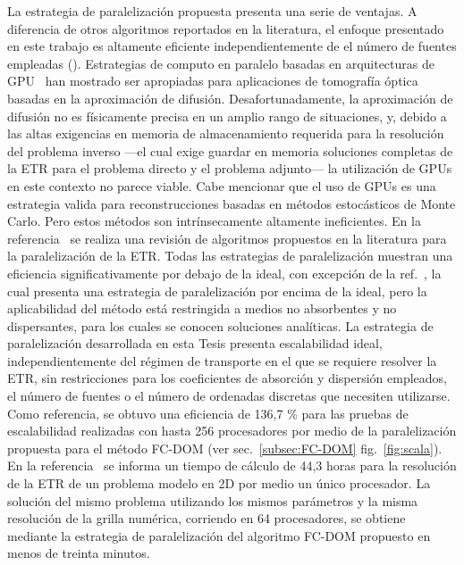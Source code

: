 La estrategia de paralelización propuesta presenta una serie de
ventajas. A diferencia de otros algoritmos reportados en la literatura, el enfoque
presentado en este trabajo es altamente eficiente independientemente de
el número de fuentes empleadas (\cf \cite{Hielscher2004}).
Estrategias de computo en paralelo basadas en arquitecturas de GPU~\cite {Doulgerakis2017} han mostrado ser apropiadas para aplicaciones de tomografía óptica basadas en la aproximación de difusión. Desafortunadamente, 
la aproximación de difusión no es físicamente precisa en un amplio rango de situaciones,
y, debido a las altas exigencias en memoria de almacenamiento requerida para 
la resolución del problema inverso ---el cual exige guardar en memoria soluciones completas 
de la ETR para el problema 
directo y el problema adjunto--- la utilización de GPUs en este contexto no parece viable. 
Cabe mencionar que el uso de GPUs es una estrategia valida para reconstrucciones 
basadas en métodos estocásticos de Monte Carlo. Pero estos métodos son intrínsecamente 
altamente ineficientes. En la 
referencia~\cite{Coelho2014} se realiza una revisión de algoritmos propuestos en la literatura 
para la paralelización de la ETR. Todas las estrategias de paralelización muestran una eficiencia significativamente por debajo de la ideal, con excepción de la ref.~\cite {Colomer2013}, la cual presenta una estrategia de paralelización 
por encima de la ideal, pero
la aplicabilidad del método está restringida a medios no absorbentes y no dispersantes, 
para los cuales se conocen soluciones analíticas. La estrategia de paralelización 
desarrollada en esta Tesis presenta escalabilidad ideal, independientemente 
del régimen de transporte en el que se requiere resolver la ETR, sin restricciones 
para los coeficientes de absorción y dispersión empleados, el número de fuentes o el número de ordenadas discretas que necesiten utilizarse. Como referencia, se obtuvo una eficiencia de 136,7 \% para las pruebas de escalabilidad realizadas con hasta 256 procesadores por
medio de la paralelización propuesta para el método FC-DOM (ver sec.~\ref{subsec:FC-DOM} fig.~\ref{fig:scala}). En la referencia~\cite [p. 153]{Fujii2014} 
se informa un tiempo de cálculo de 44,3 horas para la resolución de la ETR de un problema modelo 
en 2D por medio un único procesador. La solución del mismo problema utilizando 
los mismos parámetros y la misma resolución de la grilla numérica, corriendo en 64 procesadores, se obtiene mediante la estrategia de paralelización del algoritmo FC-DOM propuesto en menos de treinta minutos.


